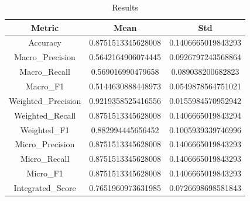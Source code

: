 \begin{table}[htbp]
\centering
\caption{Results}
\label{tab:csv}
\small
\setlength{\tabcolsep}{4pt}
\begin{tabular}{|c|c|c|}
\hline
Metric & Mean & Std \\
\hline
Accuracy & 0.8751513345628008 & 0.1406665019843293 \\
Macro_Precision & 0.5642164906074445 & 0.0926797243568864 \\
Macro_Recall & 0.569016990479658 & 0.089038200682823 \\
Macro_F1 & 0.5144630888448973 & 0.0549878564751021 \\
Weighted_Precision & 0.9219358525416556 & 0.0155984570952942 \\
Weighted_Recall & 0.8751513345628008 & 0.1406665019843294 \\
Weighted_F1 & 0.882994445656452 & 0.1005939339746996 \\
Micro_Precision & 0.8751513345628008 & 0.1406665019843293 \\
Micro_Recall & 0.8751513345628008 & 0.1406665019843293 \\
Micro_F1 & 0.8751513345628008 & 0.1406665019843293 \\
Integrated_Score & 0.7651960973631985 & 0.0726698698581843 \\
\hline
\end{tabular}
\end{table}